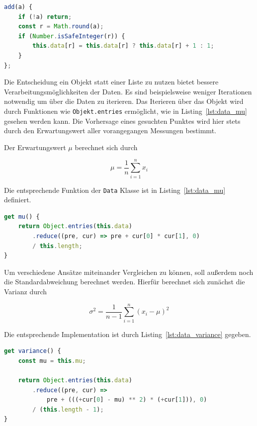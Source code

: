 \begin{lstlisting}[language=JavaScript, caption={Definition der \lstinline{add} Funktion welche dazu genutzt wird der \lstinline{Data} Klasse neue Werte hinzuzufügen}, label={lst:data_add}]
add(a) {
    if (!a) return;
    const r = Math.round(a);
    if (Number.isSafeInteger(r)) {
        this.data[r] = this.data[r] ? this.data[r] + 1 : 1;
    }
};
\end{lstlisting}

Die Entscheidung ein Objekt statt einer Liste zu nutzen bietet bessere Verarbeitungsmöglichkeiten der Daten. %
Es sind beispielsweise weniger Iterationen notwendig um über die Daten zu iterieren.
Das Iterieren über das Objekt wird durch Funktionen wie \lstinline{Objekt.entries} ermöglicht, wie in Listing~\ref{lst:data_mu} gesehen werden kann.
Die Vorhersage eines gesuchten Punktes wird hier stets durch den Erwartungswert aller vorangegangen Messungen bestimmt.

Der Erwartungswert $\mu$ berechnet sich durch

\begin{equation}
    \mu = \frac{1}{n} \sum_{i=1}^n{x_i}
\end{equation}

Die entsprechende Funktion der \lstinline{Data} Klasse ist in Listing~\ref{lst:data_mu} definiert.

\begin{lstlisting}[language=JavaScript, caption={Definition der \lstinline{mu} Funktion, welche den Erwartungswert der Daten in \lstinline{Data} berechnet},label={lst:data_mu}]
get mu() {
    return Object.entries(this.data)
        .reduce((pre, cur) => pre + cur[0] * cur[1], 0)
        / this.length;
}
\end{lstlisting}

Um verschiedene Ansätze miteinander Vergleichen zu können, soll au{\ss}erdem noch die Standardabweichung berechnet werden.
Hierfür berechnet sich zunächst die Varianz durch

\begin{equation}
    \sigma^2 = \frac{1}{n - 1} \sum_{i=1}^n(x_i - \mu)^2
\end{equation}

Die entsprechende Implementation ist durch Listing~\ref{lst:data_variance} gegeben.

\begin{lstlisting}[language=JavaScript, caption={Definition der \lstinline{variance} Funktion, welche die Varianz der Daten in \lstinline{Data} berechnet}, label={lst:data_variance}]
get variance() {
    const mu = this.mu;

    return Object.entries(this.data)
        .reduce((pre, cur) =>
            pre + (((+cur[0] - mu) ** 2) * (+cur[1])), 0)
        / (this.length - 1);
}
\end{lstlisting}

